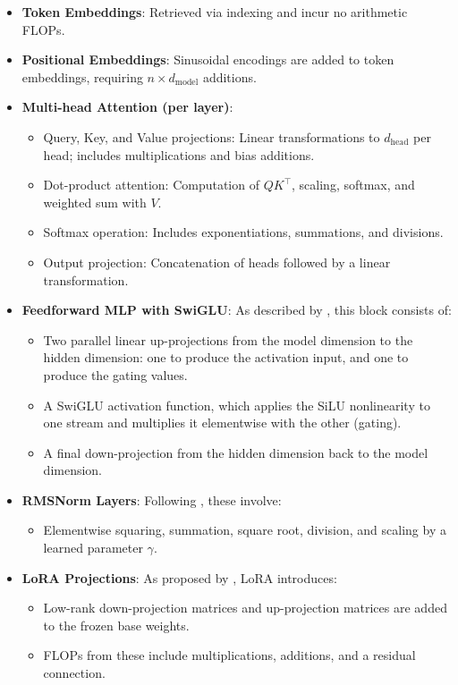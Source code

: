 \documentclass[a4paper,12pt]{article}
\begin{document}
\begin{itemize}
  \item \textbf{Token Embeddings}: Retrieved via indexing and incur no arithmetic FLOPs.
  
  \item \textbf{Positional Embeddings}: Sinusoidal encodings are added to token embeddings, requiring $n \times d_{\text{model}}$ additions.

  \item \textbf{Multi-head Attention (per layer)}:
  \begin{itemize}
    \item Query, Key, and Value projections: Linear transformations to $d_{\text{head}}$ per head; includes multiplications and bias additions.
    \item Dot-product attention: Computation of $QK^\top$, scaling, softmax, and weighted sum with $V$.
    \item Softmax operation: Includes exponentiations, summations, and divisions.
    \item Output projection: Concatenation of heads followed by a linear transformation.
  \end{itemize}

  \item \textbf{Feedforward MLP with SwiGLU}: As described by \citet{shazeer2020glu}, this block consists of:
  \begin{itemize}
    \item Two parallel linear up-projections from the model dimension to the hidden dimension: one to produce the activation input, and one to produce the gating values.
    \item A SwiGLU activation function, which applies the SiLU nonlinearity to one stream and multiplies it elementwise with the other (gating).
    \item A final down-projection from the hidden dimension back to the model dimension.
  \end{itemize}  

  \item \textbf{RMSNorm Layers}: Following \citet{zhang2019root}, these involve:
  \begin{itemize}
    \item Elementwise squaring, summation, square root, division, and scaling by a learned parameter $\gamma$.
  \end{itemize}

  \item \textbf{LoRA Projections}: As proposed by \citet{hu2021lora}, LoRA introduces:
  \begin{itemize}
    \item Low-rank down-projection matrices and up-projection matrices are added to the frozen base weights.
    \item FLOPs from these include multiplications, additions, and a residual connection.
  \end{itemize}


\end{itemize}
\end{document}

